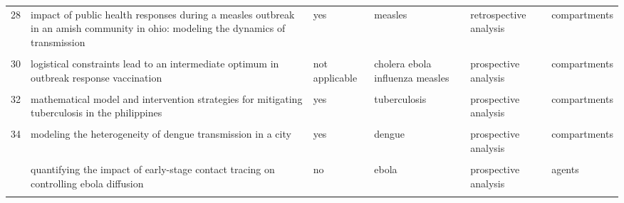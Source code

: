 \documentclass[
]{article}
\begin{document}
\begin{landscape}
\begin{longtable}{l>{\raggedright\arraybackslash}p{3.3cm}l>{\raggedright\arraybackslash}p{3.3cm}>{\raggedright\arraybackslash}p{2cm}l}
28 & impact of public health responses during a measles outbreak in an amish community in ohio: modeling the dynamics of transmission & yes & measles & retrospective analysis & compartments\\
\cellcolor{gray!6}{29} & \cellcolor{gray!6}{initial validation of a simulation model for estimating the impact of serogroup a neisseria meningitidis vaccination in the african meningitis belt} & \cellcolor{gray!6}{yes} & \cellcolor{gray!6}{meningococcal meningitis} & \cellcolor{gray!6}{prospective analysis} & \cellcolor{gray!6}{compartments}\\
30 & logistical constraints lead to an intermediate optimum in outbreak response vaccination & not applicable & cholera ebola influenza measles & prospective analysis & compartments\\
\addlinespace
\cellcolor{gray!6}{31} & \cellcolor{gray!6}{manipulation of contact network structure and the impact on foot-and-mouth disease transmission} & \cellcolor{gray!6}{yes} & \cellcolor{gray!6}{fmd} & \cellcolor{gray!6}{prospective analysis} & \cellcolor{gray!6}{compartments}\\
32 & mathematical model and intervention strategies for mitigating tuberculosis in the philippines & yes & tuberculosis & prospective analysis & compartments\\
\cellcolor{gray!6}{33} & \cellcolor{gray!6}{measles outbreak response decision-making under uncertainty: a retrospective analysis} & \cellcolor{gray!6}{yes} & \cellcolor{gray!6}{measles} & \cellcolor{gray!6}{retrospective analysis} & \cellcolor{gray!6}{compartments}\\
34 & modeling the heterogeneity of dengue transmission in a city & yes & dengue & prospective analysis & compartments\\
\cellcolor{gray!6}{35} & \cellcolor{gray!6}{modelling the large-scale yellow fever outbreak in luanda, angola, and the impact of vaccination} & \cellcolor{gray!6}{no} & \cellcolor{gray!6}{yellow fever} & \cellcolor{gray!6}{retrospective analysis} & \cellcolor{gray!6}{compartments}\\
\addlinespace
36 & quantifying the impact of early-stage contact tracing on controlling ebola diffusion & no & ebola & prospective analysis & agents\\
\cellcolor{gray!6}{37} & \cellcolor{gray!6}{simulation of key interventions for seasonal influenza outbreak control at school in changsha, china} & \cellcolor{gray!6}{yes} & \cellcolor{gray!6}{influenza} & \cellcolor{gray!6}{prospective analysis} & \cellcolor{gray!6}{compartments}\\

\end{longtable}
\end{landscape}
\end{document}

